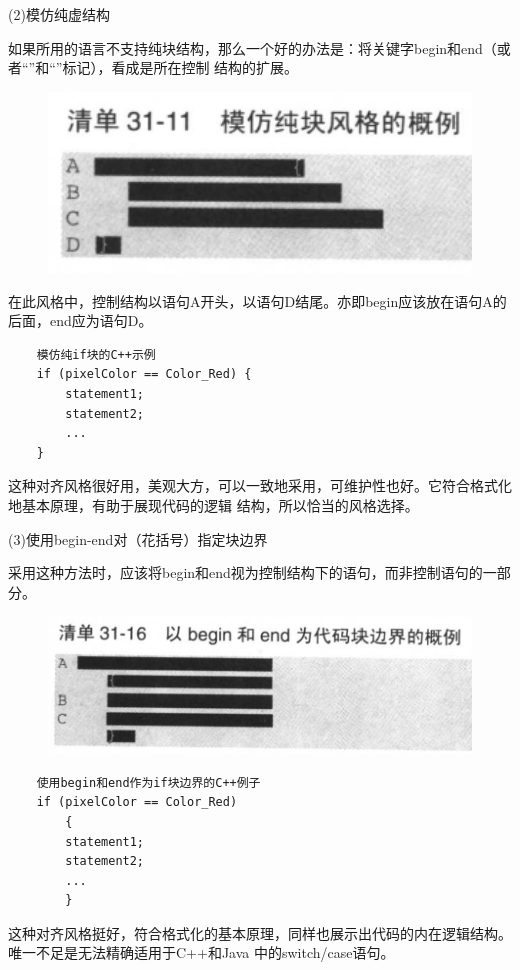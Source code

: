 \documentclass{article}
\begin{document}
\par
(2)模仿纯虚结构
\par
如果所用的语言不支持纯块结构，那么一个好的办法是：将关键字begin和end（或者“{”和“}”标记），看成是所在控制
结构的扩展。
\begin{figure}[htb]
    \centering
    \includegraphics[width=15cm]{figure33.png}
\end{figure}
在此风格中，控制结构以语句A开头，以语句D结尾。亦即begin应该放在语句A的后面，end应为语句D。
\begin{lstlisting}
    模仿纯if块的C++示例
    if (pixelColor == Color_Red) {
        statement1;
        statement2;
        ...
    }
\end{lstlisting}
这种对齐风格很好用，美观大方，可以一致地采用，可维护性也好。它符合格式化地基本原理，有助于展现代码的逻辑
结构，所以恰当的风格选择。

\par
(3)使用begin-end对（花括号）指定块边界
\par
采用这种方法时，应该将begin和end视为控制结构下的语句，而非控制语句的一部分。
\begin{figure}[htb]
    \centering
    \includegraphics[width=15cm]{figure34.png}
\end{figure}
\begin{lstlisting}
    使用begin和end作为if块边界的C++例子
    if (pixelColor == Color_Red)
        {
        statement1;
        statement2;
        ...
        }
\end{lstlisting}
这种对齐风格挺好，符合格式化的基本原理，同样也展示出代码的内在逻辑结构。唯一不足是无法精确适用于C++和Java
中的switch/case语句。
\end{document}

